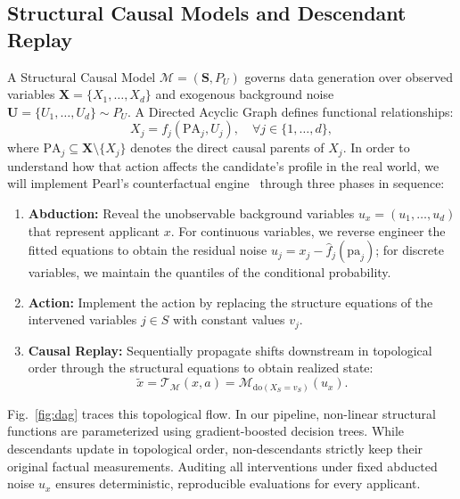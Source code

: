 \documentclass[nolineno]{paper/ieee-access/ieeeaccess}%
\newcommand{\SCM}{\ensuremath{\mathcal{M}}}
\newcommand{\Replay}{\ensuremath{\mathcal{T}_{\SCM}}}
\begin{document}
\subsection{Structural Causal Models and Descendant Replay}
A Structural Causal Model $\SCM = (\mathbf{S}, P_U)$ governs data generation over observed variables $\mathbf{X} = \{X_1, \dots, X_d\}$ and exogenous background noise $\mathbf{U} = \{U_1, \dots, U_d\} \sim P_U$. A Directed Acyclic Graph defines functional relationships:
\begin{equation}
  X_j = f_j(\mathrm{PA}_j, U_j), \quad \forall j \in \{1, \dots, d\},
  \label{eq:scm}
\end{equation}
where $\mathrm{PA}_j \subseteq \mathbf{X} \setminus \{X_j\}$ denotes the direct causal parents of $X_j$.
In order to understand how that action affects the candidate's profile in the real world, we will implement Pearl's counterfactual engine~\cite{pearl2009causality} through three phases in sequence:
\begin{enumerate}
\item \textbf{Abduction:} Reveal the unobservable background variables $u_x = (u_1, \dots, u_d)$ that represent applicant $x$. For continuous variables, we reverse engineer the fitted equations to obtain the residual noise $u_j = x_j - \hat{f}_j(\mathrm{pa}_j)$; for discrete variables, we maintain the quantiles of the conditional probability.
\item \textbf{Action:} Implement the action by replacing the structure equations of the intervened variables $j \in S$ with constant values $v_j$.
\item \textbf{Causal Replay:} Sequentially propagate shifts downstream in topological order through the structural equations to obtain realized state:
\begin{equation}
  \widetilde{x} = \Replay(x, a) = \SCM_{\mathrm{do}(X_S = v_S)}(u_x).
  \label{eq:replay}
\end{equation}
\end{enumerate}

Fig.~\ref{fig:dag} traces this topological flow. In our pipeline, non-linear structural functions are parameterized using gradient-boosted decision trees. While descendants update in topological order, non-descendants strictly keep their original factual measurements. Auditing all interventions under fixed abducted noise $u_x$ ensures deterministic, reproducible evaluations for every applicant.
\end{document}
